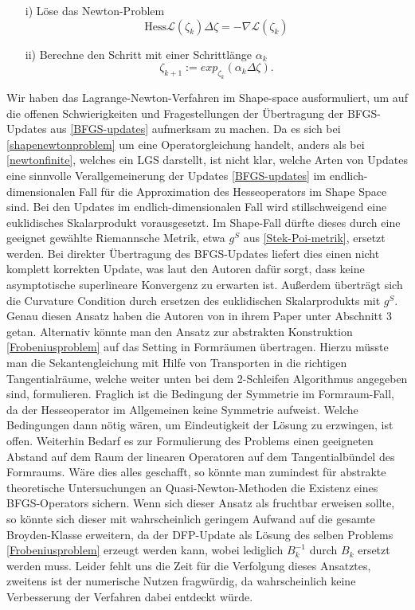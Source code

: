 \begin{itemize}
	\item[i)] Löse das Newton-Problem \\
	\begin{equation}\label{shapenewtonproblem}
	\text{Hess}\mathcal{L}(\zeta_k)\Delta \zeta = - \nabla \mathcal{L}(\zeta_k)
	\end{equation}
	\item[ii)] Berechne den Schritt mit einer Schrittlänge $\alpha_k$
	\begin{equation}
	\zeta_{k+1} := exp_{\zeta_k}(\alpha_k \Delta \zeta).
	\end{equation}
\end{itemize}
Wir haben das Lagrange-Newton-Verfahren im Shape-space ausformuliert, um auf die offenen Schwierigkeiten und Fragestellungen der Übertragung der BFGS-Updates aus \ref{BFGS-updates} aufmerksam zu machen. Da es sich bei 
\ref{shapenewtonproblem} um eine Operatorgleichung handelt, anders als bei \ref{newtonfinite}, welches ein LGS darstellt, ist nicht klar, welche Arten von Updates eine sinnvolle Verallgemeinerung der Updates \ref{BFGS-updates} im endlich-dimensionalen Fall für die Approximation des Hesseoperators im Shape Space sind. Bei den Updates im endlich-dimensionalen Fall wird stillschweigend eine euklidisches Skalarprodukt vorausgesetzt. Im Shape-Fall dürfte dieses durch eine geeignet gewählte Riemannsche Metrik, etwa $g^S$ aus \ref{Stek-Poi-metrik}, ersetzt werden. Bei direkter Übertragung des BFGS-Updates liefert dies einen nicht komplett korrekten Update, was laut den Autoren dafür sorgt, dass keine asymptotische superlineare Konvergenz zu erwarten ist. Außerdem überträgt sich die Curvature Condition durch ersetzen des euklidischen Skalarprodukts mit $g^S$. Genau diesen Ansatz haben die Autoren von \cite{diffusion} in ihrem Paper unter Abschnitt 3 getan. Alternativ könnte man den Ansatz zur abstrakten Konstruktion \ref{Frobeniusproblem} auf das Setting in Formräumen übertragen. Hierzu müsste man die Sekantengleichung mit Hilfe von Transporten in die richtigen Tangentialräume, welche weiter unten bei dem 2-Schleifen Algorithmus angegeben sind, formulieren. Fraglich ist die Bedingung der Symmetrie im Formraum-Fall, da der Hesseoperator im Allgemeinen keine Symmetrie aufweist. Welche Bedingungen dann nötig wären, um Eindeutigkeit der Lösung zu erzwingen, ist offen. Weiterhin Bedarf es zur Formulierung des Problems einen geeigneten Abstand auf dem Raum der linearen Operatoren auf dem Tangentialbündel des Formraums. Wäre dies alles geschafft, so könnte man zumindest für abstrakte theoretische Untersuchungen an Quasi-Newton-Methoden die Existenz eines BFGS-Operators sichern. Wenn sich dieser Ansatz als fruchtbar erweisen sollte, so könnte sich dieser mit wahrscheinlich geringem Aufwand auf die gesamte Broyden-Klasse erweitern, da der DFP-Update als Lösung des selben Problems \ref{Frobeniusproblem} erzeugt werden kann, wobei lediglich $B_k^{-1}$ durch $B_k$ ersetzt werden muss. Leider fehlt uns die Zeit für die Verfolgung dieses Ansatztes, zweitens ist der numerische Nutzen fragwürdig, da wahrscheinlich keine Verbesserung der Verfahren dabei entdeckt würde. 

